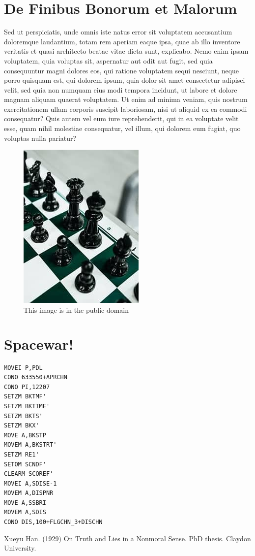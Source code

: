 \documentclass[twoside, UTF8, a4paper]{ctexart}
\numberwithin{figure}{section}
\numberwithin{table}{section}
\numberwithin{equation}{section}
\begin{document}
\clearpage
\begin{appendices}
\section{De Finibus Bonorum et Malorum}

Sed ut perspiciatis, unde omnis iste natus error sit voluptatem accusantium doloremque laudantium, totam rem aperiam eaque ipsa, quae ab illo inventore veritatis et quasi architecto beatae vitae dicta sunt, explicabo. Nemo enim ipsam voluptatem, quia voluptas sit, aspernatur aut odit aut fugit, sed quia consequuntur magni dolores eos, qui ratione voluptatem sequi nesciunt, neque porro quisquam est, qui dolorem ipsum, quia dolor sit amet consectetur adipisci velit, sed quia non numquam eius modi tempora incidunt, ut labore et dolore magnam aliquam quaerat voluptatem. Ut enim ad minima veniam, quis nostrum exercitationem ullam corporis suscipit laboriosam, nisi ut aliquid ex ea commodi consequatur? Quis autem vel eum iure reprehenderit, qui in ea voluptate velit esse, quam nihil molestiae consequatur, vel illum, qui dolorem eum fugiat, quo voluptas nulla pariatur?

\begin{figure}[!ht]
\centering
\includegraphics[width=0.3\linewidth]{./img/black-chess-pieces.jpg}
\caption{This image is in the public domain}
\label{fig:black-chess-pieces}
\end{figure}

\clearpage
\section{Spacewar!}

\begin{lstlisting}[style=appendix]
MOVEI P,PDL
CONO 633550+APRCHN
CONO PI,12207
SETZM BKTMF'
SETZM BKTIME'
SETZM BKTS'
SETZM BKX'
MOVE A,BKSTP
MOVEM A,BKSTRT'
SETZM RE1'
SETOM SCNDF'
CLEARM SCOREF'
MOVEI A,SDISE-1
MOVEM A,DISPNR
MOVE A,SSBRI
MOVEM A,SDIS
CONO DIS,100+FLGCHN_3+DISCHN
\end{lstlisting}

\end{appendices}


\clearpage
\begin{flushleft}
\begin{thebibliography}{0}
\kaishu{}
\bibitem{} Xueyu Han. (1929) On Truth and Lies in a Nonmoral Sense. PhD thesis. Claydon University.
\end{thebibliography}
\end{flushleft}
\end{document}
